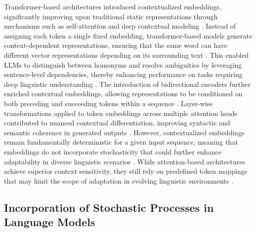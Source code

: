 \documentclass{article}
\begin{document}
Transformer-based architectures introduced contextualized embeddings, significantly improving upon traditional static representations through mechanisms such as self-attention and deep contextual modeling \cite{keith2024optimizing}. Instead of assigning each token a single fixed embedding, transformer-based models generate context-dependent representations, ensuring that the same word can have different vector representations depending on its surrounding text \cite{slaten2024probabilistic}. This enabled LLMs to distinguish between homonyms and resolve ambiguities by leveraging sentence-level dependencies, thereby enhancing performance on tasks requiring deep linguistic understanding \cite{nishikado2024mitigating}. The introduction of bidirectional encoders further enriched contextual embeddings, allowing representations to be conditioned on both preceding and succeeding tokens within a sequence \cite{beard2024adaptive}. Layer-wise transformations applied to token embeddings across multiple attention heads contributed to nuanced contextual differentiation, improving syntactic and semantic coherence in generated outputs \cite{yarie2024mitigating}. However, contextualized embeddings remain fundamentally deterministic for a given input sequence, meaning that embeddings do not incorporate stochasticity that could further enhance adaptability in diverse linguistic scenarios \cite{shofman2024negative}. While attention-based architectures achieve superior context sensitivity, they still rely on predefined token mappings that may limit the scope of adaptation in evolving linguistic environments \cite{harrington2024mitigating}.

\subsection{Incorporation of Stochastic Processes in Language Models}
\end{document}
